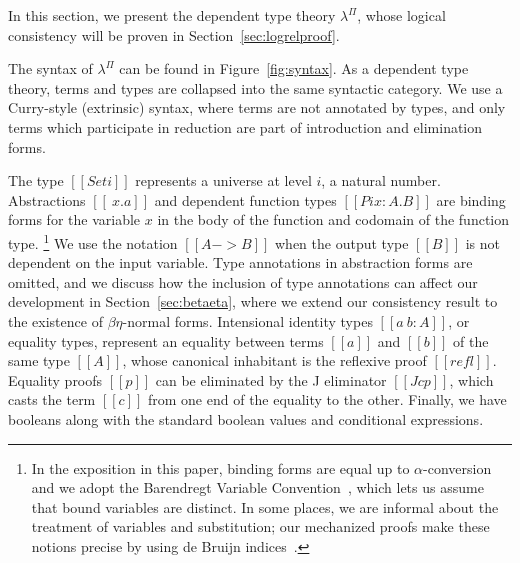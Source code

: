 \documentclass[\ifpublic nolinenum\else\fi,online,OA]{jfp}
\newcommand{\lang}{$\lambda^{\Pi}$\xspace}
\theoremstyle{definition}
\begin{document}
In this section, we present the dependent type theory \lang{}, whose logical
consistency will be proven in Section~\ref{sec:logrelproof}.

The syntax of \lang can be found in Figure~\ref{fig:syntax}.  As a dependent
type theory, terms and types are collapsed into the same syntactic
category. We use a Curry-style (extrinsic) syntax, where terms are not
annotated by types, and only terms which participate in reduction are part of
introduction and elimination forms.

The type $[[Set i]]$ represents a universe at level $i$,
a natural number. Abstractions $[[ \ x . a ]]$ and
dependent function types $[[Pi x : A . B]]$ are binding forms for the variable
$x$ in the body of the function and codomain of the function type.%
\footnote{In the exposition in this paper, binding forms are equal up to
  $\alpha$-conversion and we adopt the Barendregt Variable
  Convention~\cite{barendregt:lambda-calculus}, which lets us assume that
  bound variables are distinct.  In some places, we are informal about the
  treatment of variables and substitution; our mechanized proofs make these
  notions precise by using de Bruijn indices~\citep{debruijn1994automath}. }
We use the notation $[[A -> B]]$ when the output type $[[B]]$ is not dependent
on the input variable. Type annotations in abstraction forms are omitted, and
we discuss how the inclusion of type annotations can affect
our development in Section~\ref{sec:betaeta}, where we extend our
consistency result to the existence of $\beta\eta$-normal forms.
Intensional identity types $[[a ~ b : A]]$, or equality types, represent an
equality between terms $[[a]]$ and $[[b]]$ of the same type $[[A]]$, whose
canonical inhabitant is the reflexive proof $[[refl]]$. Equality proofs $[[p]]$
can be eliminated by the J eliminator $[[J c p]]$, which casts the term $[[c]]$
from one end of the equality to the other. Finally, we have booleans along with
the standard boolean values and conditional expressions.
\end{document}
